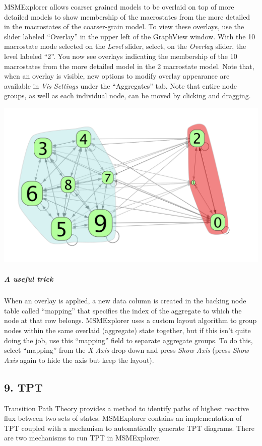 \documentclass[10pt,a4paper]{report}
\begin{document}
MSMExplorer allows coarser grained models to be overlaid on top of more detailed models to show membership of the macrostates from the more detailed in the macrostates of the coarser-grain model. To view these overlays, use the slider labeled ``Overlay'' in the upper left of the GraphView window. With the 10 macrostate mode selected on the \emph{Level} slider, select, on the \emph{Overlay} slider, the level labeled ``2''. You now see overlays indicating the membership of the 10 macrostates from the more detailed model in the 2 macrostate model. Note that, when an overlay is visible, new options to modify overlay appearance are available in \emph{Vis Settings} under the ``Aggregates'' tab. Note that entire node groups, as well as each individual node, can be moved by clicking and dragging.

\begin{center}
\includegraphics[scale=.3]{hier.png}
\end{center}

\subparagraph*{A useful trick}
When an overlay is applied, a new data column is created in the backing node table called ``mapping'' that specifies the index of the aggregate to which the node at that row belongs. MSMExplorer uses a custom layout algorithm to group nodes within the same overlaid (aggregate) state together, but if this isn't quite doing the job, use this ``mapping'' field to separate aggregate groups. To do this, select ``mapping'' from the \emph{X Axis} drop-down and press \emph{Show Axis} (press \emph{Show Axis} again to hide the axis but keep the layout).  

\subsection*{9. TPT}
Transition Path Theory provides a method to identify paths of highest reactive flux between two sets of states. MSMExplorer contains an implementation of TPT coupled with a mechanism to automatically generate TPT diagrams. There are two mechanisms to run TPT in MSMExplorer. 
\end{document}
